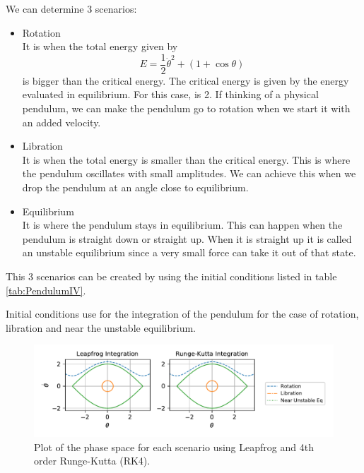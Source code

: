 We can determine 3 scenarios:
\begin{itemize}
    \item Rotation \\
    It is when the total energy given by
    \begin{equation}
    E=\frac{1}{2}\Dot{\theta}^2+\left(1+\cos\theta\right)
    \end{equation}
    is bigger than the critical energy. The critical energy is given by the energy evaluated in equilibrium. For this case, is 2. If thinking of a physical pendulum, we can make the pendulum go to rotation when we start it with an added velocity.
    \item Libration \\
    It is when the total energy is smaller than the critical energy. This is where the pendulum oscillates with small amplitudes. We can achieve this when we drop the pendulum at an angle close to equilibrium.
    \item Equilibrium \\
    It is where the pendulum stays in equilibrium. This can happen when the pendulum is straight down or straight up. When it is straight up it is called an unstable equilibrium since a very small force can take it out of that state. 
\end{itemize}
This 3 scenarios can be created by using the initial conditions listed in table \ref{tab:PendulumIV}.

\begin{table}[]
    \centering

    \caption{Initial conditions use for the integration of the pendulum for the case of rotation, libration and near the unstable equilibrium.}
    \label{tab:PendulumIV}
\end{table}



\begin{figure}[ht!]
    \centering
    \includegraphics{CodeAndFigures/PendulumPhaseSpace.pdf}
    \caption{Plot of the phase space for each scenario using Leapfrog and 4th order Runge-Kutta (RK4).}
    \label{fig:pendulumPhaseSpace}
\end{figure}

